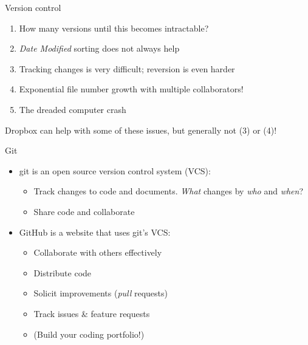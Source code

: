 \documentclass[ignorenonframetext,]{beamer}
\providecommand{\tightlist}{%
  \setlength{\itemsep}{0pt}\setlength{\parskip}{0pt}}
\begin{document}
\begin{frame}{Version control}
\protect\hypertarget{version-control-1}{}

\begin{enumerate}
\tightlist
\item
  How many versions until this becomes intractable?
\item
  \emph{Date Modified} sorting does not always help
\item
  Tracking changes is very difficult; reversion is even harder
\item
  Exponential file number growth with multiple collaborators!
\item
  The dreaded computer crash
\end{enumerate}

Dropbox can help with some of these issues, but generally not (3) or
(4)!

\end{frame}

\begin{frame}{Git}
\protect\hypertarget{git}{}

\begin{itemize}
\tightlist
\item
  git is an open source version control system (VCS):

  \begin{itemize}
  \tightlist
  \item
    Track changes to code and documents. \emph{What} changes by
    \emph{who} and \emph{when}?
  \item
    Share code and collaborate
  \end{itemize}
\item
  GitHub is a website that uses git's VCS:

  \begin{itemize}
  \tightlist
  \item
    Collaborate with others effectively
  \item
    Distribute code
  \item
    Solicit improvements (\emph{pull} requests)
  \item
    Track issues \& feature requests
  \item
    (Build your coding portfolio!)
  \end{itemize}
\end{itemize}

\end{frame}
\end{document}
